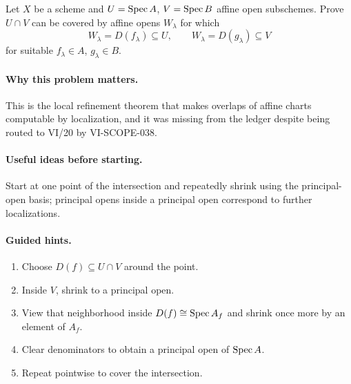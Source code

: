 \begin{problem}\label{prob:vi20-p02}
Let $X$ be a scheme and $U=\operatorname{Spec} A$, $V=\operatorname{Spec} B$ affine open subschemes.  Prove $U\cap V$ can be covered by affine opens $W_\lambda$ for which
\[
W_\lambda=D(f_\lambda)\subseteq U,
\qquad
W_\lambda=D(g_\lambda)\subseteq V
\]
for suitable $f_\lambda\in A$, $g_\lambda\in B$.
\end{problem}

\ifdefined\FullProblemDossiers
\paragraph{Why this problem matters.}
This is the local refinement theorem that makes overlaps of affine charts computable by localization, and it was missing from the ledger despite being routed to VI/20 by VI-SCOPE-038.

\paragraph{Useful ideas before starting.}
Start at one point of the intersection and repeatedly shrink using the principal-open basis; principal opens inside a principal open correspond to further localizations.

\paragraph{Guided hints.}
\begin{enumerate}
\item Choose $D(f)\subseteq U\cap V$ around the point.
\item Inside $V$, shrink to a principal open.
\item View that neighborhood inside $D(f)\cong\operatorname{Spec} A_f$ and shrink once more by an element of $A_f$.
\item Clear denominators to obtain a principal open of $\operatorname{Spec} A$.
\item Repeat pointwise to cover the intersection.
\end{enumerate}

